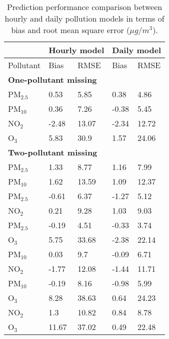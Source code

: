 \documentclass[
  12,
]{article}
\begin{document}
\begin{table}

\caption{Prediction performance comparison between hourly and daily pollution models in terms of bias and root mean square error ($\mu g/m^{3}$).}\label{tab:hourlydailycomparison}
\centering
\begin{tabular}[h]{lllll}
\hline\hline
\multicolumn{1}{c}{\textbf{ }} & \multicolumn{2}{c}{\textbf{Hourly model}} & \multicolumn{2}{c}{\textbf{Daily model}} \\\hline
Pollutant  & Bias & RMSE & Bias & RMSE\\\hline
\multicolumn{5}{l}{\textbf{One-pollutant missing}}\\\hline
\hspace{1em}PM$_{2.5}$ & 0.53 & 5.85 & 0.38 & 4.86\\
\hspace{1em}PM$_{10}$ & 0.36 & 7.26 & -0.38 & 5.45\\
\hspace{1em}NO$_{2}$  & -2.48 & 13.07 & -2.34 & 12.72\\
\hspace{1em}O$_{3}$   & 5.83 & 30.9 & 1.57 & 24.06\\\hline
\multicolumn{5}{l}{\textbf{Two-pollutant missing}}\\\hline
\hspace{1em}PM$_{2.5}$ & 1.33 & 8.77 & 1.16 & 7.99\\
\hspace{1em}PM$_{10}$ & 1.62 & 13.59 & 1.09 & 12.37\\\hline
\hspace{1em}PM$_{2.5}$ & -0.61 & 6.37 & -1.27 & 5.12\\
\hspace{1em}NO$_{2}$ & 0.21 & 9.28 & 1.03 & 9.03\\\hline
\hspace{1em}PM$_{2.5}$ & -0.19 & 4.51 & -0.33 & 3.74\\
\hspace{1em}O$_{3}$ & 5.75 & 33.68 & -2.38 & 22.14\\\hline
\hspace{1em}PM$_{10}$ & 0.03 & 9.7 & -0.09 & 6.71\\
\hspace{1em}NO$_{2}$ & -1.77 & 12.08 & -1.44 & 11.71\\\hline
\hspace{1em}PM$_{10}$ & -0.19 & 8.16 & -0.98 & 5.99\\
\hspace{1em}O$_{3}$ & 8.28 & 38.63 & 0.64 & 24.23\\\hline
\hspace{1em}NO$_{2}$ & 1.3 & 10.82 & 0.84 & 8.78\\
\hspace{1em}O$_{3}$ & 11.67 & 37.02 & 0.49 & 22.48\\\hline
\end{tabular}
\end{table}
\end{document}
